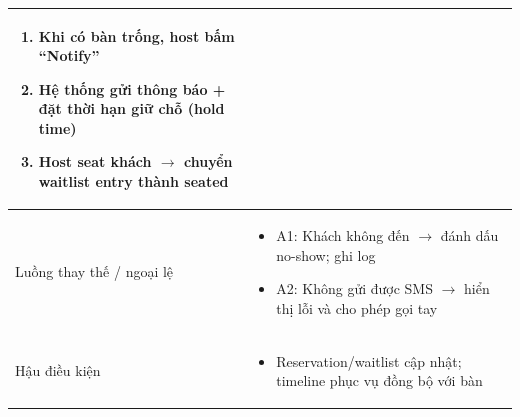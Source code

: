 \begin{longtable}{|>{\raggedright\arraybackslash}p{}|>{\raggedright\arraybackslash}p{}|}
\begin{enumerate}[leftmargin=*]
\item Khi có bàn trống, host bấm “Notify”
\item Hệ thống gửi thông báo + đặt thời hạn giữ chỗ (hold time)
\item Host seat khách $\rightarrow$ chuyển waitlist entry thành seated
\end{enumerate}
\vspace{-0.5em}
\\
\hline
Luồng thay thế / ngoại lệ &
\vspace{-0.5em}
\begin{itemize}[leftmargin=*]
\item A1: Khách không đến $\rightarrow$ đánh dấu no-show; ghi log
\item A2: Không gửi được SMS $\rightarrow$ hiển thị lỗi và cho phép gọi tay
\end{itemize}
\vspace{-0.5em}
\\
\hline
Hậu điều kiện &
\vspace{-0.5em}
\begin{itemize}[leftmargin=*]
\item Reservation/waitlist cập nhật; timeline phục vụ đồng bộ với bàn
\end{itemize}
\vspace{-0.5em}
\\
\hline
\end{longtable}

